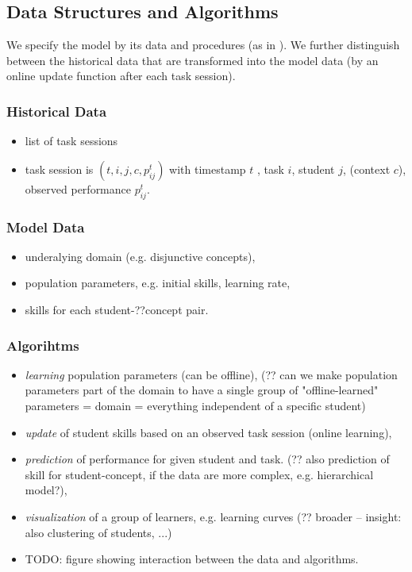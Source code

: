 \subsection{Data Structures and Algorithms}

We specify the model by its data and procedures
(as in \cite{pelanek-learner-modeling}).
We further distinguish between the historical data that are transformed into
the model data (by an online update function after each task session).

\subsubsection{Historical Data}
\begin{itemize}
\item list of task sessions
\item task session is $(t, i, j, c, p^{t}_{ij})$ with
  timestamp $t$ , task $i$, student $j$, (context $c$),
  observed performance $p^{t}_{ij}$.
\end{itemize}

\subsubsection{Model Data}
\begin{itemize}
\item underalying domain (e.g. disjunctive concepts),
\item population parameters, e.g. initial skills, learning rate,
\item skills for each student-??concept pair.
\end{itemize}

\subsubsection{Algorihtms}
\begin{itemize}
\item \emph{learning} population parameters (can be offline),
  (?? can we make population parameters part of the domain to have a single
  group of "offline-learned" parameters = domain = everything independent
  of a specific student)
\item \emph{update} of student skills based on an observed task session
  (online learning),
\item \emph{prediction} of performance for given student and task.
  (?? also prediction of skill for student-concept,
  if the data are more complex, e.g. hierarchical model?),
\item \emph{visualization} of a group of learners, e.g. learning curves
  (?? broader -- insight: also clustering of students, ...)
\item TODO: figure showing interaction between the data and algorithms.
\end{itemize}

